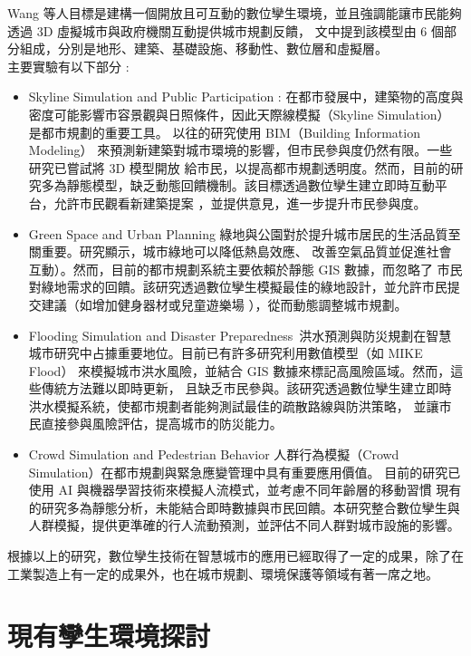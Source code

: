 Wang 等人\cite{White2021DigitalTwin}目標是建構一個開放且可互動的數位孿生環境，並且強調能讓市民能夠透過 3D 虛擬城市與政府機關互動提供城市規劃反饋，
文中提到該模型由 6 個部分組成，分別是地形、建築、基礎設施、移動性、數位層和虛擬層。\\
主要實驗有以下部分 :
\begin{itemize}
    \item Skyline Simulation and Public Participation :
          在都市發展中，建築物的高度與密度可能影響市容景觀與日照條件，因此天際線模擬（Skyline Simulation） 是都市規劃的重要工具。
          以往的研究使用 BIM（Building Information Modeling） 來預測新建築對城市環境的影響，但市民參與度仍然有限。一些研究已嘗試將 3D 模型開放
          給市民，以提高都市規劃透明度。然而，目前的研究多為靜態模型，缺乏動態回饋機制。該目標透過數位孿生建立即時互動平台，允許市民觀看新建築提案
          ，並提供意見，進一步提升市民參與度。
    \item Green Space and Urban Planning
          綠地與公園對於提升城市居民的生活品質至關重要。研究顯示，城市綠地可以降低熱島效應、
          改善空氣品質並促進社會互動）。然而，目前的都市規劃系統主要依賴於靜態 GIS 數據，而忽略了
          市民對綠地需求的回饋。該研究透過數位孿生模擬最佳的綠地設計，並允許市民提交建議（如增加健身器材或兒童遊樂場
          ），從而動態調整城市規劃。
    \item Flooding Simulation and Disaster Preparedness\
          洪水預測與防災規劃在智慧城市研究中占據重要地位。目前已有許多研究利用數值模型（如 MIKE Flood）
          來模擬城市洪水風險，並結合 GIS 數據來標記高風險區域。然而，這些傳統方法難以即時更新，
          且缺乏市民參與。該研究透過數位孿生建立即時洪水模擬系統，使都市規劃者能夠測試最佳的疏散路線與防洪策略，
          並讓市民直接參與風險評估，提高城市的防災能力。
    \item Crowd Simulation and Pedestrian Behavior
          人群行為模擬（Crowd Simulation）在都市規劃與緊急應變管理中具有重要應用價值。
          目前的研究已使用 AI 與機器學習技術來模擬人流模式，並考慮不同年齡層的移動習慣
          現有的研究多為靜態分析，未能結合即時數據與市民回饋。本研究整合數位孿生與人群模擬，提供更準確的行人流動預測，並評估不同人群對城市設施的影響。
\end{itemize}
根據以上的研究，數位孿生技術在智慧城市的應用已經取得了一定的成果，除了在工業製造上有一定的成果外，也在城市規劃、環境保護等領域有著一席之地。
\section{現有孿生環境探討}
